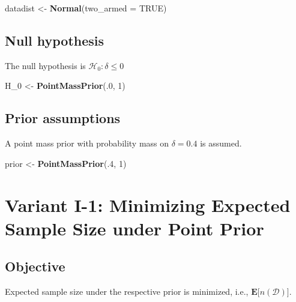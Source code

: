 \documentclass[]{book}
\newenvironment{Shaded}{\begin{snugshade}}{\end{snugshade}}
\newcommand{\DataTypeTok}[1]{\textcolor[rgb]{0.13,0.29,0.53}{#1}}
\newcommand{\DecValTok}[1]{\textcolor[rgb]{0.00,0.00,0.81}{#1}}
\newcommand{\KeywordTok}[1]{\textcolor[rgb]{0.13,0.29,0.53}{\textbf{#1}}}
\newcommand{\NormalTok}[1]{#1}
\newcommand{\OtherTok}[1]{\textcolor[rgb]{0.56,0.35,0.01}{#1}}
\newcommand{\StringTok}[1]{\textcolor[rgb]{0.31,0.60,0.02}{#1}}
\begin{document}
\begin{Shaded}
\begin{Highlighting}[]
\NormalTok{datadist <-}\StringTok{ }\KeywordTok{Normal}\NormalTok{(}\DataTypeTok{two_armed =} \OtherTok{TRUE}\NormalTok{)}
\end{Highlighting}
\end{Shaded}

\hypertarget{null-hypothesis}{%
\subsection{Null hypothesis}\label{null-hypothesis}}

The null hypothesis is \(\mathcal{H}_0:\delta \leq 0\)

\begin{Shaded}
\begin{Highlighting}[]
\NormalTok{H_}\DecValTok{0}\NormalTok{ <-}\StringTok{ }\KeywordTok{PointMassPrior}\NormalTok{(.}\DecValTok{0}\NormalTok{, }\DecValTok{1}\NormalTok{)}
\end{Highlighting}
\end{Shaded}

\hypertarget{prior-assumptions}{%
\subsection{Prior assumptions}\label{prior-assumptions}}

A point mass prior with probability mass on \(\delta = 0.4\) is assumed.

\begin{Shaded}
\begin{Highlighting}[]
\NormalTok{prior <-}\StringTok{ }\KeywordTok{PointMassPrior}\NormalTok{(.}\DecValTok{4}\NormalTok{, }\DecValTok{1}\NormalTok{)}
\end{Highlighting}
\end{Shaded}

\hypertarget{variantI_1}{%
\section{Variant I-1: Minimizing Expected Sample Size under Point Prior}\label{variantI_1}}

\hypertarget{objective}{%
\subsection{Objective}\label{objective}}

Expected sample size under the respective prior is minimized, i.e.,
\(\boldsymbol{E}\big[n(\mathcal{D})\big]\).
\end{document}
